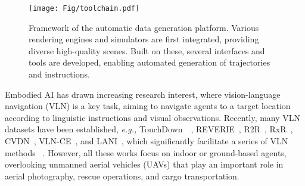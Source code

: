 
\begin{figure*}
    \centering
    \texttt{[image: Fig/toolchain.pdf]}
    \caption{Framework of the automatic data generation platform. Various rendering engines and simulators are first integrated, providing diverse high-quality scenes. Built on these, several interfaces and tools are developed, enabling automated generation of trajectories and instructions.}
    \label{fig:data_gen}
    \vspace{-0.1cm}
\end{figure*}
    

Embodied AI has drawn increasing research interest, where vision-language navigation (VLN) is a key task, aiming to navigate agents to a target location according to linguistic instructions and visual observations. Recently, many VLN datasets have been established, \emph{e.g.,} TouchDown~~\cite{Touchdown}, REVERIE~\cite{REVERIE}, R2R~\cite{R2R}, RxR~\cite{RxR}, CVDN~\cite{CVDN}, VLN-CE~\cite{VLN-CE}, and LANI~\cite{LANI}, which significantly facilitate a series of VLN methods ~\cite{instructnav, AG-CMTP, law, CM2, CMA, ETPNav, gridmm, MGMap, navid}. However, all these works focus on indoor or ground-based agents, overlooking unmanned aerial vehicles (UAVs) that play an important role in aerial photography, rescue operations, and cargo transportation. 


